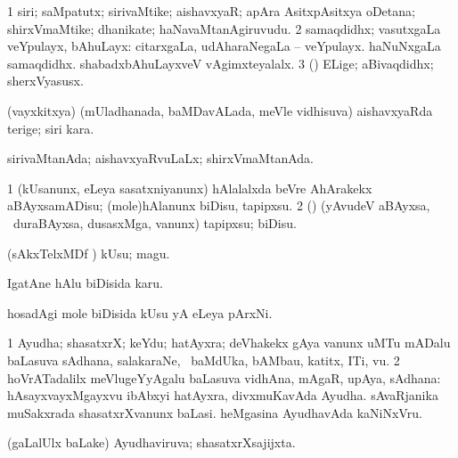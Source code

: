 \bentry
{} 
\gl{\nA}
\expl{}
\bmng
\bnum
\num{1} siri; saMpatutx; sirivaMtike; aishavxyaR; apAra AsitxpAsitxya oDetana; shirxVmaMtike; dhanikate; haNavaMtanAgiruvudu. 
\num{2} samaqdidhx; vasutxgaLa veYpulayx, bAhuLayx:  citarxgaLa, udAharaNegaLa -- veYpulayx.  haNuNxgaLa samaqdidhx.  shabadxbAhuLayxveV vAgimxteyalalx. 
\num{3} (\pArxparx) ELige; aBivaqdidhx; sherxVyasusx. 
\enum
\emng
\eentry

\bentry
{} 
\gl{\nA}
\expl{}
\bmng
(vayxkitxya) (mUladhanada, baMDavALada, meVle vidhisuva) aishavxyaRda terige; siri kara. 
\emng
\eentry

\bentry
{} 
\gl{\gu}
\bmng
sirivaMtanAda; aishavxyaRvuLaLx; shirxVmaMtanAda. 
\emng
\eentry

\bentry
{} 
\gl{\sakirx}
\expl{}
\bmng
\bnum
\num{1} (kUsanunx, eLeya sasatxniyanunx) hAlalalxda beVre AhArakekx aBAyxsamADisu; (mole)hAlanunx biDisu, tapipxsu. 
\num{2} (\rUpa) (yAvudeV aBAyxsa, \kanmu\ duraBAyxsa, dusasxMga, \mo vanunx) tapipxsu; biDisu. 
\enum
\emng
\eentry

\bentry
{} 
\gl{\nA}
\expl{}
\bmng
(sAkxTelxMDf \parx) kUsu; magu. 
\emng
\eentry

\bentry
{} 
\gl{\nA}
\expl{}
\bmng
IgatAne hAlu biDisida karu. 
\emng
\eentry

\bentry
{} 
\gl{\nA}
\expl{}
\bmng
hosadAgi mole biDisida kUsu yA eLeya pArxNi. 
\emng
\eentry

\bentry
{} 
\gl{\nA}
\expl{}
\bmng
\bnum
\num{1} Ayudha; shasatxrX; keYdu; hatAyxra; deVhakekx gAya \mo vanunx uMTu mADalu baLasuva sAdhana, salakaraNe, \udA\ baMdUka, bAMbau, katitx, ITi, \mo vu. 
\num{2} hoVrATadalilx meVlugeYyAgalu baLasuva vidhAna, mAgaR, upAya, sAdhana:  hAsayxvayxMgayxvu ibAbxyi hatAyxra, divxmuKavAda Ayudha.  sAvaRjanika muSakxrada shasatxrXvanunx baLasi.  heMgasina AyudhavAda kaNiNxVru. 
\enum
\emng
\eentry

\bentry
{} 
\gl{\gu}
\expl{}
\bmng
(\saMpa gaLalUlx baLake) Ayudhaviruva; shasatxrXsajijxta. 
\emng
\eentry

